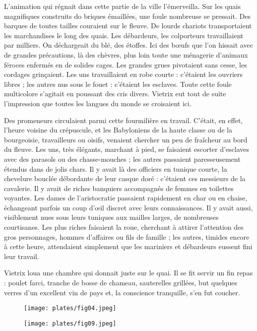 \documentclass[a4paper, 11pt, oneside, polutonikogreek, french]{article}
\begin{document}
L'animation qui régnait dans cette partie de la ville l'émerveilla. Sur les quais magnifiques construits do briques émaillées, une foule nombreuse se pressait. Des barques de toutes tailles couraient sur le fleuve. De lourds chariots transportaient les marchandises le long des quais. Les débardeurs, les colporteurs travaillaient par milliers. On déchargeait du blé, des étoffes. Ici des bœufs que l'on hissait avec de grandes précautions, là des chèvres, plus loin toute une ménagerie d'animaux féroces enfermés en de solides cages. Les grandes grues pivotaient sans cesse, les cordages grinçaient. Les uns travaillaient en robe courte : c'étaient les ouvriers libres ; les autres nus sous le fouet : c'étaient les esclaves. Toute cette foule multicolore s'agitait en poussant des cris divers. Vietrix eut tout de suite l'impression que toutes les langues du monde se croisaient ici.

Des promeneurs circulaient parmi cette fourmilière en travail. C'était, en effet, l'heure voisine du crépuscule, et les Babyloniens de la haute classe ou de la bourgeoisie, travailleurs ou oisifs, venaient chercher un peu de fraîcheur au bord du fleuve. Les uns, très élégants, marchant à pied, se faisaient escorter d'esclaves avec des parasols ou des chasse-mouches ; les autres passaient paresseusement étendus dans de jolis chars. Il y avait là des officiers en tunique courte, la chevelure bouclée débordante de leur casque doré : c'étaient ces messieurs de la cavalerie. Il y avait de riches banquiers accompagnés de femmes en toilettes voyantes. Les dames de l'aristocratie passaient rapidement en char ou en chaise, échangeant parfois un coup d'œil discret avec leurs connaissances. Il y avait aussi, visiblement nues sous leurs tuniques aux mailles larges, de nombreuses courtisanes. Les plus riches faisaient la roue, cherchant à attirer l'attention des gros personnages, hommes d'affaires ou fils de famille ; les autres, timides encore à cette heure, attendaient simplement que les mariniers et débardeurs eussent fini leur travail.

Vietrix loua une chambre qui donnait juste sur le quai. Il se fit servir un fin repas : poulet farci, tranche de bosse de chameau, sauterelles grillées, but quelques verres d'un excellent vin de pays et, la conscience tranquille, s'en fut coucher.

\begin{figure}[H]
\centering
\texttt{[image: plates/fig04.jpeg]}
\end{figure}
\clearpage
\begin{figure}[H]
\centering
\texttt{[image: plates/fig09.jpeg]}
\end{figure}
\end{document}
